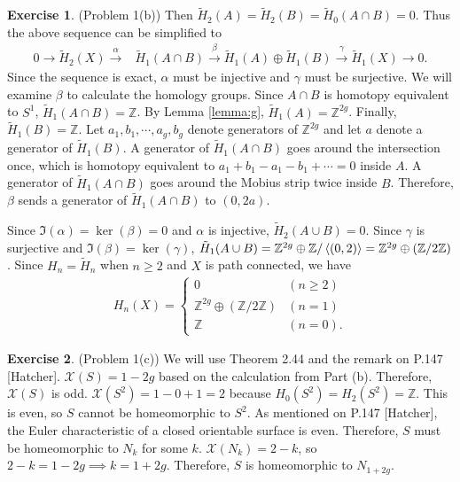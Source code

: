 \documentclass[12pt, psamsfonts]{amsart}
\theoremstyle{definition}
\newtheorem*{exer}{Exercise}
\theoremstyle{remark}
\numberwithin{equation}{section}
\begin{document}
\begin{exer}{(Problem 1(b))}
  Then $\tilde{H}_2(A) = \tilde{H}_2(B) = \tilde{H}_0(A \cap B) = 0$.
  Thus the above sequence can be simplified to 
  \begin{align*}
    0 \rightarrow \tilde{H}_2(X) \xrightarrow{\alpha} &\tilde{H}_1(A \cap B) \xrightarrow{\beta} \tilde{H}_1(A) \oplus \tilde{H}_1(B) \xrightarrow{\gamma} \tilde{H}_1(X) \rightarrow 0.
  \end{align*}
  Since the sequence is exact, $\alpha$ must be injective and $\gamma$ must be surjective.
  We will examine $\beta$ to calculate the homology groups.
  Since $A \cap B$ is homotopy equivalent to $S^1$, $\tilde{H}_1(A \cap B) = \mathbb{Z}$.
  By Lemma \ref{lemma:g}, $\tilde{H}_1(A) = \mathbb{Z}^{2g}$.
  Finally, $\tilde{H}_1(B) = \mathbb{Z}$.
  Let $a_1, b_1, \cdots, a_g, b_g$ denote generators of $\mathbb{Z}^{2g}$ and let $a$ denote a generator of $\tilde{H}_1(B)$.
  A generator of $\tilde{H}_1(A \cap B)$ goes around the intersection once, which is homotopy equivalent to $a_1 + b_1 - a_1 - b_1 + \cdots = 0$ inside $A$.
  A generator of $\tilde{H}_1(A \cap B)$ goes around the Mobius strip twice inside $B$.
  Therefore, $\beta$ sends a generator of $\tilde{H}_1(A \cap B)$ to $(0, 2a)$.

  Since $\Im(\alpha) = \ker(\beta) = 0$ and $\alpha$ is injective, $\tilde{H}_2(A \cup B) = 0$.
  Since $\gamma$ is surjective and $\Im(\beta) = \ker(\gamma)$, $\tilde{H}_1(A \cup B) = \mathbb{Z}^{2g} \oplus \mathbb{Z} / \ev{(0, 2)} = \mathbb{Z}^{2g} \oplus (\mathbb{Z} / 2\mathbb{Z})$.
  Since $H_n = \tilde{H}_n$ when $n \geq 2$ and $X$ is path connected, we have
  \begin{align*}
    H_n(X) = \begin{cases}
      0 & (n \geq 2) \\
      \mathbb{Z}^{2g} \oplus (\mathbb{Z} / 2\mathbb{Z}) & (n = 1) \\
      \mathbb{Z} & (n = 0).
    \end{cases}
  \end{align*}
\end{exer}

\begin{exer}{(Problem 1(c))}
  We will use Theorem 2.44 and the remark on P.147 [Hatcher].
  $\mathcal{X}(S) = 1 - 2g$ based on the calculation from Part (b).
  Therefore, $\mathcal{X}(S)$ is odd.
  $\mathcal{X}(S^2) = 1 - 0 + 1 = 2$ because $H_0(S^2) = H_2(S^2) = \mathbb{Z}$.
  This is even, so $S$ cannot be homeomorphic to $S^2$.
  As mentioned on P.147 [Hatcher], the Euler characteristic of a closed orientable surface is even.
  Therefore, $S$ must be homeomorphic to $N_k$ for some $k$.
  $\mathcal{X}(N_k) = 2 - k$, so $2 - k = 1 - 2g \implies k = 1 + 2g$.
  Therefore, $S$ is homeomorphic to $N_{1 + 2g}$.
\end{exer}
\end{document}
